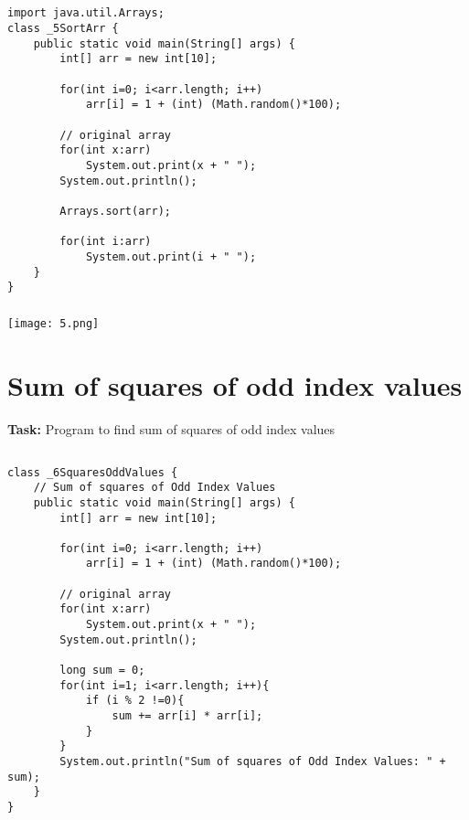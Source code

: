 \documentclass[12pt,a4paper]{article}
\begin{document}
\subsection{}
\begin{lstlisting}
import java.util.Arrays;
class _5SortArr {
    public static void main(String[] args) {
        int[] arr = new int[10];
    
        for(int i=0; i<arr.length; i++)
            arr[i] = 1 + (int) (Math.random()*100);
    
        // original array
        for(int x:arr)
            System.out.print(x + " ");
        System.out.println();
    
        Arrays.sort(arr);
    
        for(int i:arr)
            System.out.print(i + " ");
    }
}
\end{lstlisting}

\subsubsection{}
\begin{center}
    \texttt{[image: 5.png]}
\end{center}


\section{Sum of squares of odd index values}
\textbf{Task:} Program to find sum of squares of odd index values

\subsection{}
\begin{lstlisting}
class _6SquaresOddValues {
    // Sum of squares of Odd Index Values
    public static void main(String[] args) {
        int[] arr = new int[10];
    
        for(int i=0; i<arr.length; i++)
            arr[i] = 1 + (int) (Math.random()*100);
    
        // original array
        for(int x:arr)
            System.out.print(x + " ");
        System.out.println();
    
        long sum = 0;
        for(int i=1; i<arr.length; i++){
            if (i % 2 !=0){
                sum += arr[i] * arr[i];
            }
        }
        System.out.println("Sum of squares of Odd Index Values: " + sum);
    }
}
\end{lstlisting}
\end{document}
